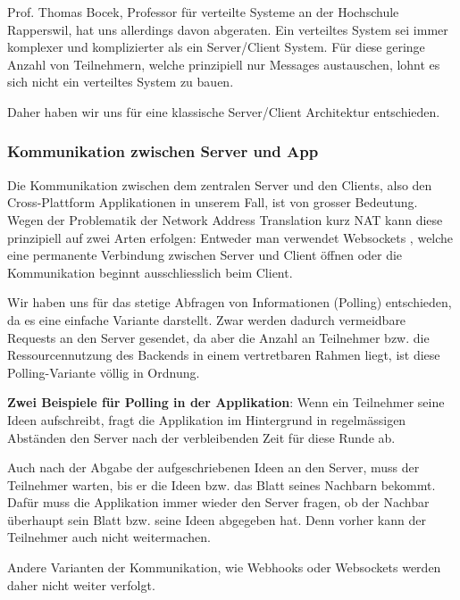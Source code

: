Prof. Thomas Bocek, Professor für verteilte Systeme an der Hochschule Rapperswil, hat uns allerdings davon abgeraten. Ein verteiltes System sei immer komplexer und komplizierter als ein Server/Client System. Für diese geringe Anzahl von Teilnehmern, welche prinzipiell nur Messages austauschen, lohnt es sich nicht ein verteiltes System zu bauen. 


Daher haben wir uns für eine klassische Server/Client Architektur entschieden.

\subsubsection{Kommunikation zwischen Server und App}
Die Kommunikation zwischen dem zentralen Server und den Clients, also den Cross-Plattform Applikationen in unserem Fall, ist von grosser Bedeutung. Wegen der Problematik der Network Address Translation kurz NAT \cite{NAT} kann diese prinzipiell auf zwei Arten erfolgen: Entweder man verwendet Websockets \cite{WebSockets}, welche eine permanente Verbindung zwischen Server und Client öffnen oder die Kommunikation beginnt ausschliesslich beim Client. 


Wir haben uns für das stetige Abfragen von Informationen (Polling) entschieden, da es eine einfache Variante darstellt. Zwar werden dadurch vermeidbare Requests an den Server gesendet, da aber die Anzahl an Teilnehmer bzw. die Ressourcennutzung des Backends in einem vertretbaren Rahmen liegt, ist diese Polling-Variante völlig in Ordnung.  

\textbf{Zwei Beispiele für Polling in der Applikation}: Wenn ein Teilnehmer seine Ideen aufschreibt, fragt die Applikation im Hintergrund in regelmässigen Abständen den Server nach der verbleibenden Zeit für diese Runde ab.


Auch nach der Abgabe der aufgeschriebenen Ideen an den Server, muss der Teilnehmer warten, bis er die Ideen bzw. das Blatt seines Nachbarn bekommt. Dafür muss die Applikation immer wieder den Server fragen, ob der Nachbar überhaupt sein Blatt bzw. seine Ideen abgegeben hat. Denn vorher kann der Teilnehmer auch nicht weitermachen.


Andere Varianten der Kommunikation, wie Webhooks oder Websockets werden daher nicht weiter verfolgt.